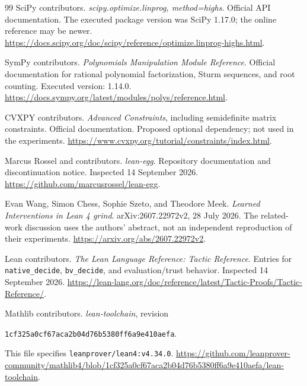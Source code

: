 \begin{thebibliography}{99}
SciPy contributors. \emph{scipy.optimize.linprog, method=highs}. Official API documentation. The executed package version was SciPy 1.17.0; the online reference may be newer.
\url{https://docs.scipy.org/doc/scipy/reference/optimize.linprog-highs.html}.

SymPy contributors. \emph{Polynomials Manipulation Module Reference}. Official documentation for rational polynomial factorization, Sturm sequences, and root counting. Executed version: 1.14.0.
\url{https://docs.sympy.org/latest/modules/polys/reference.html}.

CVXPY contributors. \emph{Advanced Constraints}, including semidefinite matrix constraints. Official documentation. Proposed optional dependency; not used in the experiments.
\url{https://www.cvxpy.org/tutorial/constraints/index.html}.

Marcus Rossel and contributors. \emph{lean-egg}. Repository documentation and discontinuation notice. Inspected 14 September 2026.
\url{https://github.com/marcusrossel/lean-egg}.

Evan Wang, Simon Chess, Sophie Szeto, and Theodore Meek. \emph{Learned Interventions in Lean 4 grind}. arXiv:2607.22972v2, 28 July 2026. The related-work discussion uses the authors' abstract, not an independent reproduction of their experiments.
\url{https://arxiv.org/abs/2607.22972v2}.

Lean contributors. \emph{The Lean Language Reference: Tactic Reference}. Entries for \texttt{native\_decide}, \texttt{bv\_decide}, and evaluation/trust behavior. Inspected 14 September 2026.
\url{https://lean-lang.org/doc/reference/latest/Tactic-Proofs/Tactic-Reference/}.

Mathlib contributors. \emph{lean-toolchain}, revision\par
{\small\texttt{1cf325a0cf67aca2b04d76b5380ff6a9e410aefa}}.\par
This file specifies \texttt{leanprover/lean4:v4.34.0}.
\url{https://github.com/leanprover-community/mathlib4/blob/1cf325a0cf67aca2b04d76b5380ff6a9e410aefa/lean-toolchain}.
\end{thebibliography}
